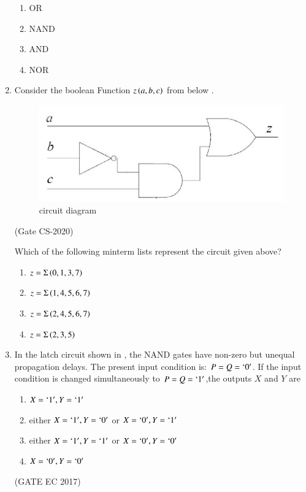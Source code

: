 \begin{enumerate}[label=\arabic*.,ref=\theenumi]
	\begin{enumerate}
       \item OR
       \item NAND
       \item AND
       \item NOR
   \end{enumerate}
\item Consider the boolean Function $z\left(a,b,c\right)$ from below 
			.
		\begin{figure}[!ht]
			\centering
			\includegraphics[width=\columnwidth]{figs/203.png}
			\caption{circuit diagram}
			\label{fig:203}
		\end{figure}
		
	\hfill{(Gate CS-2020)}
	
		Which of the following minterm lists represent the circuit given above?
	\begin{enumerate}
		\item $z=\Sigma\left(0,1,3,7\right)$
		\item $z=\Sigma\left(1,4,5,6,7\right)$
		\item $z=\Sigma\left(2,4,5,6,7\right)$
		\item $z=\Sigma\left(2,3,5\right)$
	\end{enumerate}	   
\item In the latch circuit shown
in
, the NAND gates have non-zero but unequal propagation delays. The present input condition is: $P=Q=\lq 0\rq$. If the input condition is changed simultaneously to $P=Q=\lq 1\rq$,the outputs $X$ and $Y$ are 
\begin{figure}[!ht]
\centering
\resizebox{\columnwidth}{!}{%

	}
	\caption{}
\label{figure_1}
\end{figure}
\begin{enumerate}
\item $X=\lq 1\rq,Y=\lq 1 \rq$
\item either $X=\lq 1\rq,Y=\lq 0\rq$ or $X=\lq 0\rq,Y=\lq 1\rq$
\item either $X=\lq 1\rq,Y=\lq 1\rq$ or $X=\lq 0\rq,Y=\lq 0\rq$
\item $X=\lq 0\rq,Y=\lq 0 \rq$
\end{enumerate}
\hfill(GATE EC 2017)


\end{enumerate}
